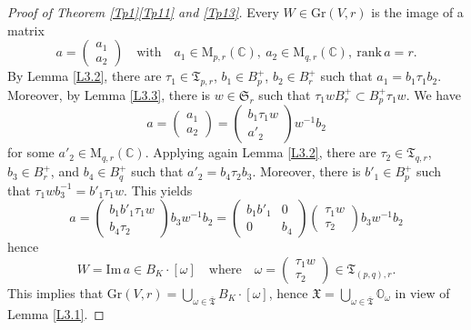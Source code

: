 \documentclass[ALCO,Unicode]{cedram}
\newcommand{\rank}{\mathrm{rank}}
\newcommand{\Mat}{\mathrm{M}}
\newcommand{\Xorbit}{\mathbb{O}}
\newcommand{\permutationsof}[1]{\mathfrak{S}_{#1}}
\newcommand{\ppermutationsof}{\mathfrak{T}}
\newcommand{\parameters}{\overline{\ppermutationsof}}
\newcommand{\Xfv}{\mathfrak{X}}
\newcommand{\Grass}{\mathrm{Gr}}
\newcommand{\mC}{\mathbb{C}}
\begin{document}
\begin{proof}[Proof of Theorem \ref{Tp1}\ref{Tp11} and \ref{Tp13}]
Every $W\in\Grass(V,r)$ is the image of a matrix
\[a=\begin{pmatrix} a_1\\ a_2 \end{pmatrix}\quad\mbox{with}\quad a_1\in\Mat_{p,r}(\mC),\ a_2\in\Mat_{q,r}(\mC),\ \rank\,a=r.\]
By Lemma \ref{L3.2}, there are $\tau_1\in \ppermutationsof_{p,r}$,
$b_1\in B_p^+$, $b_2\in B_r^+$ such that $a_1=b_1\tau_1b_2$. Moreover, by Lemma \ref{L3.3}, there is $w\in\permutationsof{r}$ such that $\tau_1wB_r^+\subset B_p^+\tau_1w$. We have
\[
a=\begin{pmatrix} a_1\\ a_2 \end{pmatrix}= \begin{pmatrix} b_1\tau_1w\\ a'_2\end{pmatrix}w^{-1}b_2
\]
for some $a'_2\in\Mat_{q,r}(\mC)$. Applying again Lemma \ref{L3.2}, there are $\tau_2\in\ppermutationsof_{q,r}$, $b_3\in B_r^+$, and $b_4\in B_q^+$ such that $a'_2=b_4\tau_2b_3$. Moreover, there is $b'_1\in B_p^+$ such that $\tau_1wb_3^{-1}=b'_1\tau_1w$. This yields
\[a=\begin{pmatrix} b_1b'_1\tau_1w\\ b_4\tau_2\end{pmatrix}b_3w^{-1}b_2=\begin{pmatrix} b_1b'_1 & 0\\ 0 & b_4\end{pmatrix}\begin{pmatrix}\tau_1w\\ \tau_2\end{pmatrix}b_3w^{-1}b_2\]
hence
\[
W=\mathrm{Im}\,a\in B_K\cdot[\omega]\quad\mbox{where}\quad \omega=\begin{pmatrix} \tau_1w\\ \tau_2\end{pmatrix}\in\ppermutationsof_{(p,q),r}.
\]
This implies that $\Grass(V,r)=\bigcup_{\omega\in\parameters}B_K\cdot[\omega]$, hence $\Xfv=\bigcup_{\omega\in\parameters}\Xorbit_\omega$ in view of Lemma \ref{L3.1}.


\end{proof}
\end{document}
